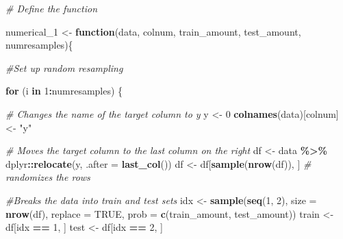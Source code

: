\documentclass[
]{book}
\newenvironment{Shaded}{\begin{snugshade}}{\end{snugshade}}
\newcommand{\AttributeTok}[1]{\textcolor[rgb]{0.13,0.29,0.53}{#1}}
\newcommand{\CommentTok}[1]{\textcolor[rgb]{0.56,0.35,0.01}{\textit{#1}}}
\newcommand{\ConstantTok}[1]{\textcolor[rgb]{0.56,0.35,0.01}{#1}}
\newcommand{\ControlFlowTok}[1]{\textcolor[rgb]{0.13,0.29,0.53}{\textbf{#1}}}
\newcommand{\DecValTok}[1]{\textcolor[rgb]{0.00,0.00,0.81}{#1}}
\newcommand{\FunctionTok}[1]{\textcolor[rgb]{0.13,0.29,0.53}{\textbf{#1}}}
\newcommand{\NormalTok}[1]{#1}
\newcommand{\OtherTok}[1]{\textcolor[rgb]{0.56,0.35,0.01}{#1}}
\newcommand{\SpecialCharTok}[1]{\textcolor[rgb]{0.81,0.36,0.00}{\textbf{#1}}}
\newcommand{\StringTok}[1]{\textcolor[rgb]{0.31,0.60,0.02}{#1}}
\begin{document}
\begin{Shaded}
\begin{Highlighting}[]

\CommentTok{\# Define the function}

\NormalTok{numerical\_1 }\OtherTok{\textless{}{-}} \ControlFlowTok{function}\NormalTok{(data, colnum, train\_amount, test\_amount, numresamples)\{}

\CommentTok{\#Set up random resampling}

\ControlFlowTok{for}\NormalTok{ (i }\ControlFlowTok{in} \DecValTok{1}\SpecialCharTok{:}\NormalTok{numresamples) \{}

\CommentTok{\# Changes the name of the target column to y}
\NormalTok{y }\OtherTok{\textless{}{-}} \DecValTok{0}
\FunctionTok{colnames}\NormalTok{(data)[colnum] }\OtherTok{\textless{}{-}} \StringTok{"y"}

\CommentTok{\# Moves the target column to the last column on the right}
\NormalTok{df }\OtherTok{\textless{}{-}}\NormalTok{ data }\SpecialCharTok{\%\textgreater{}\%}\NormalTok{ dplyr}\SpecialCharTok{::}\FunctionTok{relocate}\NormalTok{(y, }\AttributeTok{.after =} \FunctionTok{last\_col}\NormalTok{())}
\NormalTok{df }\OtherTok{\textless{}{-}}\NormalTok{ df[}\FunctionTok{sample}\NormalTok{(}\FunctionTok{nrow}\NormalTok{(df)), ] }\CommentTok{\# randomizes the rows}

\CommentTok{\#Breaks the data into train and test sets}
\NormalTok{idx }\OtherTok{\textless{}{-}} \FunctionTok{sample}\NormalTok{(}\FunctionTok{seq}\NormalTok{(}\DecValTok{1}\NormalTok{, }\DecValTok{2}\NormalTok{), }\AttributeTok{size =} \FunctionTok{nrow}\NormalTok{(df), }\AttributeTok{replace =} \ConstantTok{TRUE}\NormalTok{, }\AttributeTok{prob =} \FunctionTok{c}\NormalTok{(train\_amount, test\_amount))}
\NormalTok{train }\OtherTok{\textless{}{-}}\NormalTok{ df[idx }\SpecialCharTok{==} \DecValTok{1}\NormalTok{, ]}
\NormalTok{test }\OtherTok{\textless{}{-}}\NormalTok{ df[idx }\SpecialCharTok{==} \DecValTok{2}\NormalTok{, ]}


\end{Highlighting}
\end{Shaded}
\end{document}
